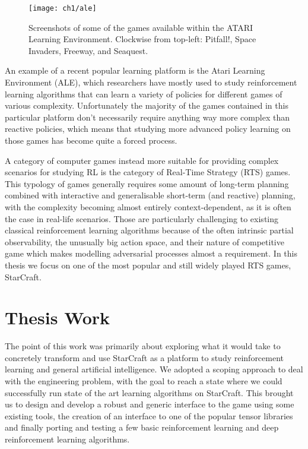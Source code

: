 \begin{figure}[h]
    \centering
    \texttt{[image: ch1/ale]}
    \caption{Screenshots of some of the games available within the ATARI
      Learning Environment. Clockwise from top-left: Pitfall!, Space Invaders,
      Freeway, and Seaquest.}
    \label{fig:ALE}
\end{figure}

An example of a recent popular learning platform is the Atari Learning
Environment (ALE), which researchers have mostly used to study reinforcement
learning algorithms that can learn a variety of policies for different games of
various complexity. Unfortunately the majority of the games contained in this
particular platform don't necessarily require anything way more complex than
reactive policies, which means that studying more advanced policy learning on
those games has become quite a forced process.

A category of computer games instead more suitable for providing complex
scenarios for studying RL is the category of Real-Time Strategy (RTS) games.
This typology of games generally requires some amount of long-term planning
combined with interactive and generalisable short-term (and reactive) planning,
with the complexity becoming almost entirely context-dependent, as it is often
the case in real-life scenarios. Those are particularly challenging to existing
classical reinforcement learning algorithms because of the often intrinsic
partial observability, the unusually big action space, and their nature of
competitive game which makes modelling adversarial processes almost a
requirement. In this thesis we focus on one of the most popular and still widely
played RTS games, StarCraft.


\section{Thesis Work}

The point of this work was primarily about exploring what it would take to
concretely transform and use StarCraft as a platform to study reinforcement
learning and general artificial intelligence. We adopted a scoping approach to
deal with the engineering problem, with the goal to reach a state where we could
successfully run state of the art learning algorithms on StarCraft. This brought
us to design and develop a robust and generic interface to the game using some
existing tools, the creation of an interface to one of the popular tensor
libraries and finally porting and testing a few basic reinforcement learning and
deep reinforcement learning algorithms.

